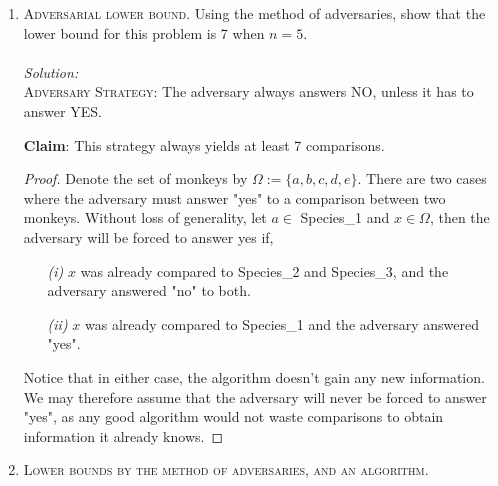 \documentclass[12pt]{article}
\theoremstyle{definition}
\theoremstyle{remark}
\newcommand\sol{%
  \\ 
  \\
  \textit{Solution:}\\%
}
\begin{document}
\begin{enumerate}
\begin{enumerate}
\begin{proof}
\end{proof}
     \item[\it (iii)] Using a decision tree-based method, show that the lower bound for this problem is 6 when $n = 5$.
     \begin{proof} 
      The algorithm outputs three sets of monkeys of identical species. For each monkey, there are three possibilities of species, hence $3^5$ total permutations. Yet, this accounts for the order of the species, which we don't care about. That is, it shouldn't matter whether the \textit{popa langurs} are grouped in Species\_1, Species\_2, or Species\_3. To remove this unwanted notion of order, we divide by $3!$. It follows that the total number of possible outputs of the algorithm is given by
    $$\frac{3^n}{3!} $$
       By part (ii), each leaf corresponds to a different output, so we have a tree with $\frac{3^n}{3!}$ leaves. Thus, by the method of decision trees, the lower bound is
    $$\left\lceil\log_{2}\left( \frac{3^5}{3!} \right)\right\rceil = 6$$

     \end{proof}
  \item[\it (iv)] For general $n,$ show that the decision tree lower bound is at least $an- b$ and at most $an + b$
    for $n \geq n_0$, for some positive numbers $a, b, n_0$. Determine suitable values for these numbers. Compare this with your answer in \textit{(i)} and conclude that the decision tree bound for this problem is rather weak.
  \end{enumerate}
  \newpage
  \item \textsc{Adversarial lower bound.} Using the method of adversaries, show that the lower bound for this problem is 7 when $n = 5$. 
  \sol 
  \textsc{Adversary Strategy:} The adversary always answers NO, unless it has to answer YES.

  \textbf{Claim}: This strategy always yields at least 7 comparisons.
  \begin{proof} 
    Denote the set of monkeys by $\Omega := \{a,b, c,d,e\}$. There are two cases where the adversary must answer "yes" to a comparison between two monkeys. Without loss of generality, let $a \in $ Species\_1 and $x\in \Omega$, then the adversary will be forced to answer yes if,
    \begin{enumerate}
      \item[\it (i)] $x$ was already compared to Species\_2 and Species\_3, and the adversary answered "no" to both.
      \item[\it (ii)] $x$ was already compared to Species\_1 and the adversary answered "yes". 
    \end{enumerate}
    Notice that in either case, the algorithm doesn't gain any new information. We may therefore assume that the adversary will never be forced to answer "yes", as any good algorithm would not waste comparisons to obtain information it already knows. 
  \end{proof}


  \newpage
  \item \textsc{Lower bounds by the method of adversaries, and an algorithm.}

\end{enumerate}
\end{document}
